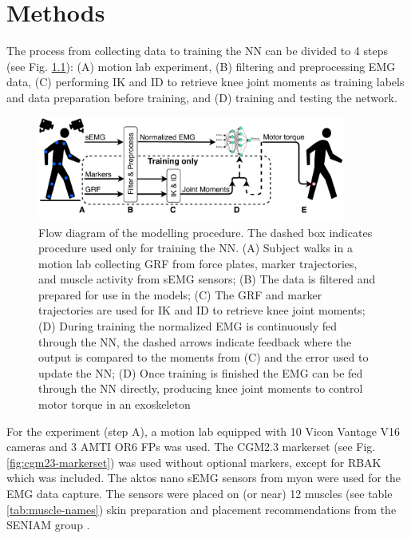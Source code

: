 \documentclass[../main.tex]{subfiles}
\begin{document}
\chapter{Methods}
The process from collecting data to training the \ac{NN} can be divided to 4 steps (see Fig. \ref{fig:process-diagram}): (A) motion lab experiment, (B) filtering and preprocessing EMG data, (C) performing \ac{IK} and \ac{ID} to retrieve knee joint moments as training labels and data preparation before training, and (D) training and testing the network.

\begin{figure}[ht]
    \centering
    \includegraphics[width=0.9\textwidth]{img/ProcessDiagram}
    \caption{Flow diagram of the modelling procedure. The dashed box indicates procedure used only for training the \ac{NN}. (A) Subject walks in a motion lab collecting \ac{GRF} from force plates, marker trajectories, and muscle activity from \ac{sEMG} sensors; (B) The data is filtered and prepared for use in the models; (C) The \ac{GRF} and marker trajectories are used for \ac{IK} and \ac{ID} to retrieve knee joint moments; (D) During training the normalized \ac{EMG} is continuously fed through the \ac{NN}, the dashed arrows indicate feedback where the output is compared to the moments from (C) and the error used to update the \ac{NN}; (D) Once training is finished the \ac{EMG} can be fed through the \ac{NN} directly, producing knee joint moments to control motor torque in an exoskeleton}
    \label{fig:process-diagram}
\end{figure}

For the experiment (step A), a motion lab equipped with 10 Vicon Vantage V16 cameras and 3 AMTI OR6 \acp{FP} was used. 
The CGM2.3 markerset \textcite{Leboeuf2019} (see Fig. \ref{fig:cgm23-markerset}) was used without optional markers, except for RBAK which was included.
The aktos nano \ac{sEMG} sensors from myon were used for the \ac{EMG} data capture. 
The sensors were placed on (or near) 12 muscles (see table \ref{tab:muscle-names}) skin preparation and placement recommendations from the SENIAM group \cite{Hermens1999, Hermens2000}.
\end{document}
